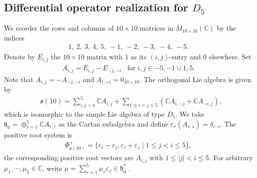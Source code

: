 \documentclass[12pt]{article}
\numberwithin{equation}{section}
\theoremstyle{definition}
\theoremstyle{remark}
\begin{document}
\subsection{Differential operator realization for $D_5$}\label{section2.2}
We reorder the rows and columns of $10\times 10$ matrices in $M_{10\times 10}(\mathbb{C})$ by the indices
\begin{eqnarray}
	1,\:2,\:3,\:4,\:5,\:-1,\:-2,\:-3,\:-4,\:-5.
\end{eqnarray}
Denote by $E_{i,j}$ the $10\times 10$ matrix with $1$ as its $(i,j)$-entry and $0$ elsewhere. Set
\begin{eqnarray}
	A_{i,j}=E_{i,j}-E_{-j,-i}\;\;\;\text{for}\;i,j\in\overline{-5,-1}\cup\overline{1,5}.
\end{eqnarray}
Note that $A_{i,j}=-A_{-j,-i}$ and $A_{i,-i}=0_{10\times 10}$. The orthogonal Lie algebra is given by
\begin{eqnarray}
	&\mathfrak{o}(10)=\sum\limits_{i,j=1}^5\mathbb{C}A_{i,j}+\sum\limits_{1\leqslant i<j\leqslant 5}(\mathbb{C}A_{i,-j}+\mathbb{C}A_{-i,j}), \label{even}
\end{eqnarray}
which is isomorphic to the simple Lie algebra of type $D_5$.
We take $\mathfrak{h}_0=\oplus_{r=1}^5\mathbb{C}A_{r,r}$ as the Cartan subalgebra and define $\varepsilon_{r}(A_{s,s})=\delta_{r,s}$. The positive root system is
\begin{eqnarray}
	\Phi^{+}_{\mathfrak{o}(10)}=\{\varepsilon_i-\varepsilon_j,\varepsilon_i+\varepsilon_j\mid 1\leqslant j<i\leqslant 5\},
\end{eqnarray}
the corresponding positive root vectors are $A_{i,j}$ with $1\leqslant |j| <i\leqslant 5$. For arbitrary $\mu_1,\cdots,\mu_5\in\mathbb{C}$, write $\mu=\sum\limits_{r=1}^5\mu_r\varepsilon_r\in\mathfrak{h}_0^*$ .
\end{document}
